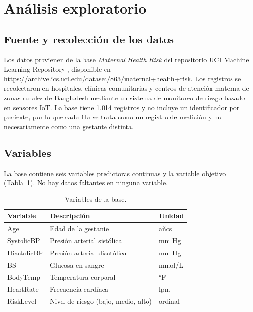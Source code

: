 \section{Análisis exploratorio}

\subsection{Fuente y recolección de los datos}
Los datos provienen de la base \emph{Maternal Health Risk} del repositorio UCI
Machine Learning Repository \citep{ahmed2020maternal}, disponible en
\url{https://archive.ics.uci.edu/dataset/863/maternal+health+risk}. Los registros
se recolectaron en hospitales, clínicas comunitarias y centros de atención
materna de zonas rurales de Bangladesh mediante un sistema de monitoreo de riesgo
basado en sensores IoT. La base tiene 1.014 registros y no incluye un
identificador por paciente, por lo que cada fila se trata como un registro de
medición y no necesariamente como una gestante distinta.

\subsection{Variables}
La base contiene seis variables predictoras continuas y la variable objetivo
(Tabla~\ref{tab:variables}). No hay datos faltantes en ninguna variable.

\begin{table}[h]
\centering
\caption{Variables de la base.}
\label{tab:variables}
\small
\begin{tabular}{lll}
\toprule
Variable & Descripción & Unidad\\
\midrule
Age         & Edad de la gestante          & años\\
SystolicBP  & Presión arterial sistólica   & mm Hg\\
DiastolicBP & Presión arterial diastólica  & mm Hg\\
BS          & Glucosa en sangre            & mmol/L\\
BodyTemp    & Temperatura corporal         & °F\\
HeartRate   & Frecuencia cardíaca          & lpm\\
RiskLevel   & Nivel de riesgo (bajo, medio, alto) & ordinal\\
\bottomrule
\end{tabular}
\end{table}

